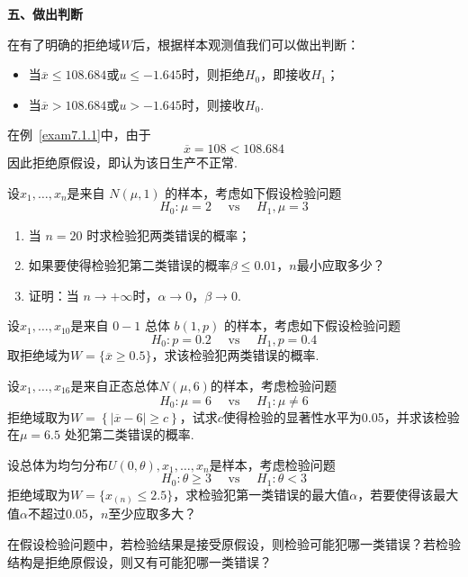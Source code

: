 \textbf{五、做出判断}

在有了明确的拒绝域$W$后，根据样本观测值我们可以做出判断：
\begin{itemize}
	\item 当$\overline{x}\leq 108.684$或$u\leq -1.645$时，则拒绝$H_{0}$，即接收$H_{1}$；
	\item 当$\overline{ x }>108.684$或$u> -1.645$时，则接收$H_{0}$.
\end{itemize}

在例~\ref{exam7.1.1}中，由于
\[\overline { x } = 108 < 108.684\]
因此拒绝原假设，即认为该日生产不正常.
\begin{xiti}
	\item 设$x_1,\dotsc ,x_n$是来自 $N(\mu ,1)$ 的样本，考虑如下假设检验问题
	\[H _ { 0 } : \mu = 2 \quad \text { vs } \quad H _ { 1 } , \mu = 3\]
	\begin{enumerate}
		\item 当 $n=20$ 时求检验犯两类错误的概率；
		\item 如果要使得检验犯第二类错误的概率$\beta \leq 0.01$，$n$最小应取多少？
		
		\item 证明：当 $n\rightarrow +\infty $时，$\alpha \rightarrow  0$，$\beta \rightarrow  0$.
	\end{enumerate}
	\item 设$x_1,\dotsc ,x_{10}$是来自 $0-1$ 总体 $b(1,p)$ 的样本，考虑如下假设检验问题
	\[H _ { 0 } : p = 0.2 \quad \text { vs } \quad H _ { 1 } , p = 0.4\]
	取拒绝域为$W = \{ \overline { x } \geq 0.5 \}$，求该检验犯两类错误的概率.
	
	\item 设$x _ { 1 } , \dotsc , x _ { 16 }$是来自正态总体$N(\mu,6)$的样本，考虑检验问题
	\[H _ { 0 } : \mu = 6 \quad \text { vs } \quad H _ { 1 } : \mu \neq 6\]
	拒绝域取为$W=\left\{\left|\overline{x}-6\right|\geq c\right\}$，试求$c$使得检验的显著性水平为0.05，并求该检验在$\mu =6.5$ 处犯第二类错误的概率.
	
	\item 设总体为均匀分布$U ( 0 , \theta ) , x _ { 1 } , \dotsc , x _ { n }$是样本，考虑检验问题
	\[H _ { 0 } : \theta \geq 3 \quad \text { vs } \quad H _ { 1 } : \theta < 3\]
	拒绝域取为$W = \{ x _ { ( n ) } \leq 2.5 \}$，求检验犯第一类错误的最大值$\alpha$，若要使得该最大值$\alpha$不超过0.05，$n$至少应取多大？
	
	\item 在假设检验问题中，若检验结果是接受原假设，则检验可能犯哪一类错误？若检验结构是拒绝原假设，则又有可能犯哪一类错误？
		
\end{xiti}


